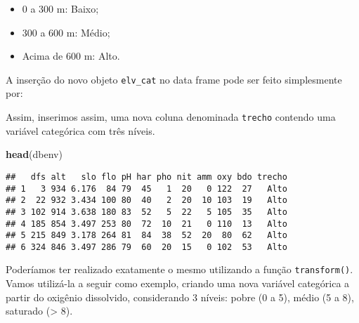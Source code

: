 \documentclass[
]{book}
\newenvironment{Shaded}{\begin{snugshade}}{\end{snugshade}}
\newcommand{\DataTypeTok}[1]{\textcolor[rgb]{0.13,0.29,0.53}{#1}}
\newcommand{\DecValTok}[1]{\textcolor[rgb]{0.00,0.00,0.81}{#1}}
\newcommand{\KeywordTok}[1]{\textcolor[rgb]{0.13,0.29,0.53}{\textbf{#1}}}
\newcommand{\NormalTok}[1]{#1}
\newcommand{\OperatorTok}[1]{\textcolor[rgb]{0.81,0.36,0.00}{\textbf{#1}}}
\newcommand{\StringTok}[1]{\textcolor[rgb]{0.31,0.60,0.02}{#1}}
\providecommand{\tightlist}{%
  \setlength{\itemsep}{0pt}\setlength{\parskip}{0pt}}
\begin{document}
\begin{itemize}
\tightlist
\item
  0 a 300 m: Baixo;
\item
  300 a 600 m: Médio;
\item
  Acima de 600 m: Alto.
\end{itemize}

\begin{Shaded}
\end{Shaded}

A inserção do novo objeto \texttt{elv\_cat} no data frame pode ser feito simplesmente por:

\begin{Shaded}
\end{Shaded}

Assim, inserimos assim, uma nova coluna denominada \texttt{trecho} contendo uma variável categórica com três níveis.

\begin{Shaded}
\begin{Highlighting}[]
\KeywordTok{head}\NormalTok{(dbenv)}
\end{Highlighting}
\end{Shaded}

\begin{verbatim}
##   dfs alt   slo flo pH har pho nit amm oxy bdo trecho
## 1   3 934 6.176  84 79  45   1  20   0 122  27   Alto
## 2  22 932 3.434 100 80  40   2  20  10 103  19   Alto
## 3 102 914 3.638 180 83  52   5  22   5 105  35   Alto
## 4 185 854 3.497 253 80  72  10  21   0 110  13   Alto
## 5 215 849 3.178 264 81  84  38  52  20  80  62   Alto
## 6 324 846 3.497 286 79  60  20  15   0 102  53   Alto
\end{verbatim}

Poderíamos ter realizado exatamente o mesmo utilizando a função \texttt{transform()}. Vamos utilizá-la a seguir como exemplo, criando uma nova variável categórica a partir do oxigênio dissolvido, considerando 3 níveis: pobre (0 a 5), médio (5 a 8), saturado (\textgreater{} 8).
\end{document}
